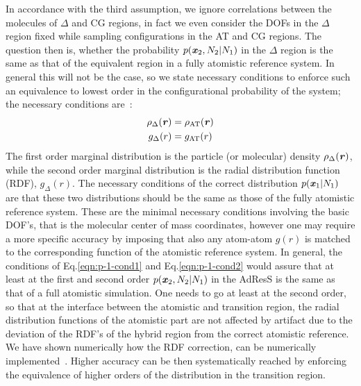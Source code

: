 \documentclass[aps,a4paper,reprint,onecolumn]{revtex4}
\newcommand{\vect}[1]{\textbf{\textit{#1}}}
\newcommand{\AT}{{\textrm{{AT}}}}
\newcommand{\HY}{{\Delta}}
\begin{document}
In accordance with the third assumption, we ignore correlations between the molecules of $\HY$ and CG regions, in fact we even consider the DOFs in the $\HY$ region fixed 
  while sampling configurations in the AT and CG regions. 
The question then is, whether the probability $p(\vect
x_2, N_2 | N_1)$ in the $\HY$ region  is the same as that of the equivalent region in a fully atomistic reference
system. In general this will not be the case, so we 
state necessary conditions to enforce such an equivalence to lowest order in the configurational probability of the system; the necessary conditions are~\cite{rdfcorr}:
\begin{align}\label{eqn:p-1-cond1}
  \rho_{\HY}(\vect r) &= \rho_{\AT}(\vect r)\\\label{eqn:p-1-cond2}
  g_{\HY}( r) &= g_{\AT}(r)
\end{align}
The first order marginal distribution is the particle (or molecular) density 
$\rho_{\HY}(\vect r)$, while the second order marginal distribution is
the radial distribution function (RDF), $g_{\HY}(r)$. 
The necessary
conditions of the correct distribution $p(\vect x_1|N_1)$
are that these two distributions should be the same as those of the fully atomistic reference system. 
These are the minimal necessary conditions involving the basic DOF's, that is the molecular center of mass coordinates, however one may require a more specific accuracy by imposing that also any atom-atom $g(r)$ is matched to the corresponding function of the atomistic reference system. 
In general, the conditions of Eq.\ref{eqn:p-1-cond1} and Eq.\ref{eqn:p-1-cond2} would assure that at least at the first and second order $p(\vect x_2, N_2 | N_1)$ in the AdResS is the same as that of a full atomistic simulation. One needs to go at least at the second order, so that at the interface between the atomistic and transition region, the radial distribution functions of the atomistic part are not affected by artifact due to the deviation of the RDF's of the hybrid region from the correct atomistic reference. 
We have shown numerically how the RDF correction, can be numerically implemented~\cite{rdfcorr}.
Higher accuracy can be then systematically reached by enforcing the equivalence of higher orders of the distribution in the transition region.
\end{document}
